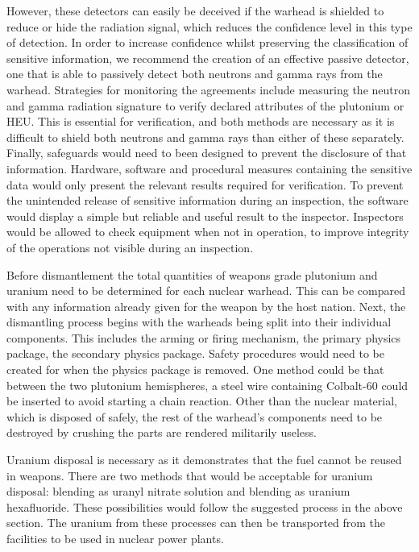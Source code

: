 \documentclass[twoside,titlepage,11pt,twocolumn,a4paper]{article}
\begin{document}
However, these detectors can easily be deceived if the warhead 
is shielded to reduce or hide the radiation signal, which 
reduces the confidence level in this type of detection. In 
order to increase confidence whilst preserving the classification
of sensitive information, we recommend the creation of an 
effective passive detector, one that is able to passively 
detect both neutrons and gamma rays from the warhead. Strategies
for monitoring the agreements include measuring the neutron and 
gamma radiation signature to verify declared attributes of the 
plutonium or HEU. This is essential for verification, and both
methods are necessary as it is difficult to shield both neutrons 
and gamma rays than either of these separately. Finally, 
safeguards would need to been designed to prevent the disclosure 
of that information. Hardware, software and procedural measures 
containing the sensitive data would only present the relevant 
results required for verification. To prevent the unintended 
release of sensitive information during an inspection, the 
software would display a simple but reliable and useful result 
to the inspector. Inspectors would be allowed to check equipment 
when not in operation, to improve integrity of the operations 
not visible during an inspection.

Before dismantlement the total quantities of weapons grade 
plutonium and uranium need to be determined for each nuclear 
warhead. This can be compared with any information already 
given for the weapon by the host nation. Next, the dismantling 
process begins with the warheads being split into their 
individual components. This includes the arming or firing 
mechanism, the primary physics package, the secondary physics 
package. Safety procedures would need to be created for when 
the physics package is removed. One method could be that 
between the two plutonium hemispheres, a steel wire containing 
Colbalt-60 could be inserted to avoid starting a chain reaction. 
Other than the nuclear material, which is disposed of safely, 
the rest of the warhead's components need to be destroyed by 
crushing the parts are rendered militarily useless.

Uranium disposal is necessary as it demonstrates that the fuel 
cannot be reused in weapons. There are two methods that would 
be acceptable for uranium disposal: blending as uranyl nitrate 
solution and blending as uranium hexafluoride. These 
possibilities would follow the suggested process in the above
section. The uranium from these processes can then be 
transported from the facilities to be used in nuclear power plants.
\end{document}

